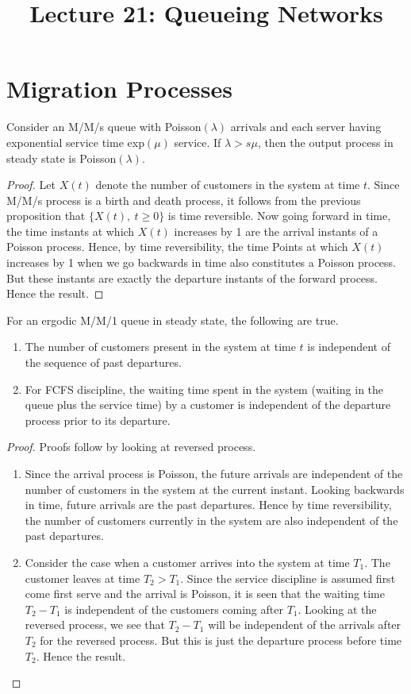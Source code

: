 \documentclass[a4paper,10pt,english]{article}
\title{Lecture 21: Queueing Networks}
\author{}
\begin{document}
\maketitle

\section{Migration Processes}

\begin{cor}
Consider an M/M/s queue with Poisson$(\lambda)$ arrivals and each server having exponential service time exp$(\mu)$ service. If $\lambda > s \mu$, then the output process in steady state is Poisson$(\lambda)$.
\end{cor}
\begin{proof}
Let $X(t)$ denote the number of customers in the system at time $t$. Since M/M/s process is a birth and death process, it follows from the previous proposition that $\{X(t),~t \geq 0\}$ is time reversible. Now going forward in time, the time instants at which $X(t)$ increases by 1 are the arrival instants of a Poisson process. Hence, by time reversibility, the time Points at which $X(t)$ increases by 1 when we go backwards in time also constitutes a Poisson process. But these instants are exactly the departure instants of the forward process. Hence the result.
\end{proof}
\begin{lem}
For an ergodic M/M/1 queue in steady state, the following are true.
\begin{enumerate}
\item The number of customers present in the system at time $t$ is independent of the sequence of past departures.
\item For FCFS discipline, the waiting time spent in the system (waiting in the queue plus the service time) by a customer is independent of the departure process prior to its departure.
\end{enumerate} 
\end{lem} 
\begin{proof}
Proofs follow by looking at reversed process.
\begin{enumerate}
\item Since the arrival process is Poisson, the future arrivals are independent of the number of customers in the system at the current instant. Looking backwards in time, future arrivals are the past departures. Hence by time reversibility, the number of customers currently in the system are also independent of the past departures.
\item Consider the case when a customer arrives into the system at time $T_1$. The customer leaves at time $T_2>T_1$.  Since the service discipline is assumed first come first serve and the arrival is Poisson, it is seen that the waiting time $T_2-T_1$ is independent of the customers coming after $T_1$. Looking at the reversed process, we see that $T_2-T_1$  will be independent of the arrivals after $T_2$ for the reversed process. But this is just the departure process before time $T_2$. Hence the result.
\end{enumerate}
\end{proof}
\end{document}
